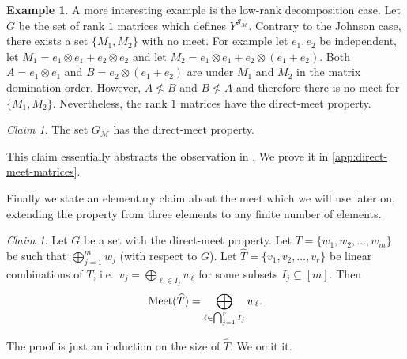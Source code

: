 \documentclass[10pt,a4paper]{article}
\newcommand{\prettyref}[1]{\cref{#1}}
\theoremstyle{definition}
\newtheorem{example}[theorem]{Example}
\theoremstyle{remark}
\newtheorem{claim}[theorem]{Claim}
\newcommand{\set}[1]{\{#1\}}
\renewcommand{\leq}{\leqslant}
\numberwithin{equation}{section}
\let\pref=\prettyref
\def\Y{Y}
\def\MP{\mathcal{M}}
\def\Meet{\textup{Meet}}
\begin{document}
\begin{example}
   A more interesting example is the low-rank decomposition case. Let \(G\) be the set of rank \(1\) matrices which defines \(\Y^{\mathcal{S}_{\MP}}\). Contrary to the Johnson case, there exists a set \(\set{M_1,M_2}\) with no meet. For example let \(e_1,e_2\) be independent, let \(M_1=e_1 \otimes e_1 + e_2 \otimes e_2\) and let \(M_2 = e_1\otimes e_1 + e_2 \otimes (e_1+e_2)\). Both \(A = e_1 \otimes e_1\) and \(B = e_2 \otimes (e_1+e_2)\) are under \(M_1\) and \(M_2\) in the matrix domination order. However, \(A \not \leq B\) and \(B \not \leq A\) and therefore there is no meet for \(\set{M_1,M_2}\). Nevertheless, the rank \(1\) matrices have the direct-meet property.

\begin{claim} \label{claim:direct-meet-matrix-poset}
    The set \(G_{\MP}\) has the direct-meet property.
\end{claim}
This claim essentially abstracts the observation in \cite[Lemma 57]{Golowich2023}. We prove it in \pref{app:direct-meet-matrices}.
\end{example}

Finally we state an elementary claim about the meet which we will use later on, extending the property from three elements to any finite number of elements.
\begin{claim} \label{claim:extended-direct-meet-property}
    Let \(G\) be a set with the direct-meet property. Let \(T=\set{w_1,w_2,\dots,w_m}\) be such that \(\bigoplus_{j=1}^m w_j\) (with respect to $G$). Let \(\widehat{T} = \set{v_1,v_2,\dots,v_r}\) be linear combinations of \(T\), i.e.\ \(v_j = \bigoplus_{\ell \in I_j}w_\ell\) for some subsets \(I_j \subseteq [m]\). Then \[\Meet(\widehat{T}) = \bigoplus_{\ell \in \bigcap_{j=1}^r I_j} w_\ell.\]
\end{claim}
The proof is just an induction on the size of \(\widehat{T}\). We omit it.
\end{document}

